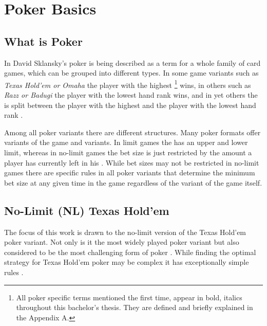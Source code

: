
\chapter{Poker Basics}
\label{cha:pokerBasics}
\section{What is Poker}
In David Sklansky's \cite{theory_of_poker} poker is being described as a term for a whole family of card games, which can be grouped into different types. In some game variants such as  \textit{Texas Hold'em or Omaha} the player with the highest  \footnote{All poker specific terms mentioned the first time, appear in bold, italics throughout this bachelor's thesis. They are defined and briefly explained in the Appendix A.} wins, in others such as \textit{Razz or Badugi} the player with the lowest hand rank wins, and in yet others the  is split between the player with the highest and the player with the lowest hand rank \cite{theory_of_poker}.\par
Among all poker variants there are different  structures. Many poker formats offer  variants of the game and  variants. In limit games the  has an upper and lower limit, whereas in no-limit games the bet size is just restricted by the amount a player has currently left in his  \cite{theory_of_poker}. While bet sizes may not be restricted in no-limit games there are specific rules in all poker variants that determine the minimum bet size at any given time in the game regardless of the variant of the game itself.
\section{No-Limit (NL) Texas Hold'em}
The focus of this work is drawn to the no-limit version of the Texas Hold'em poker variant. Not only is it the most widely played poker variant but also considered to be the most challenging form of poker \cite{strong_poker}. While finding the optimal strategy for Texas Hold'em poker may be complex it has exceptionally simple rules \cite{billings_phd}.
